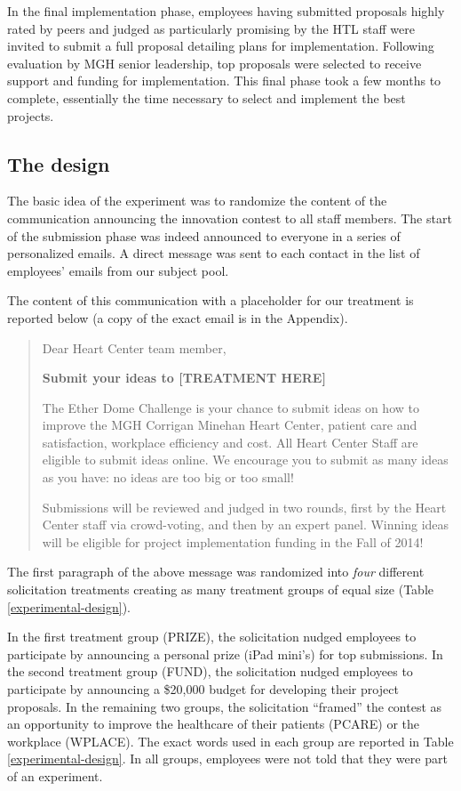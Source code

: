\documentclass[12pt, titlepage]{article}
\begin{document}
In the final implementation phase, employees having submitted proposals
highly rated by peers and judged as particularly promising by the HTL
staff were invited to submit a full proposal detailing plans for
implementation. Following evaluation by MGH senior leadership, top
proposals were selected to receive support and funding for
implementation. This final phase took a few months to complete,
essentially the time necessary to select and implement the best
projects.

\subsection{The design}\label{the-design}

The basic idea of the experiment was to randomize the content of the
communication announcing the innovation contest to all staff members.
The start of the submission phase was indeed announced to everyone in a
series of personalized emails. A direct message was sent to each contact
in the list of employees' emails from our subject pool.

The content of this communication with a placeholder for our treatment
is reported below (a copy of the exact email is in the Appendix).

\begin{quote}
Dear Heart Center team member,

\textbf{Submit your ideas to {[}TREATMENT HERE{]}}

The Ether Dome Challenge is your chance to submit ideas on how to
improve the MGH Corrigan Minehan Heart Center, patient care and
satisfaction, workplace efficiency and cost. All Heart Center Staff are
eligible to submit ideas online. We encourage you to submit as many
ideas as you have: no ideas are too big or too small!

Submissions will be reviewed and judged in two rounds, first by the
Heart Center staff via crowd-voting, and then by an expert panel.
Winning ideas will be eligible for project implementation funding in the
Fall of 2014!
\end{quote}

The first paragraph of the above message was randomized into \emph{four}
different solicitation treatments creating as many treatment groups of
equal size (Table \ref{experimental-design}).

In the first treatment group (PRIZE), the solicitation nudged employees
to participate by announcing a personal prize (iPad mini's) for top
submissions. In the second treatment group (FUND), the solicitation
nudged employees to participate by announcing a \$20,000 budget for
developing their project proposals. In the remaining two groups, the
solicitation ``framed'' the contest as an opportunity to improve the
healthcare of their patients (PCARE) or the workplace (WPLACE). The
exact words used in each group are reported in Table
\ref{experimental-design}. In all groups, employees were not told that
they were part of an experiment.
\end{document}
